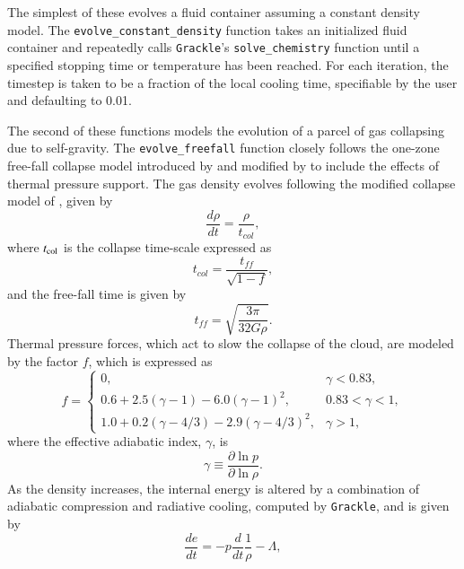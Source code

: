 The simplest of these evolves a fluid container assuming a constant
density model.  The \texttt{evolve\_constant\_density} function takes
an initialized fluid container and repeatedly calls \texttt{Grackle}'s
\texttt{solve\_chemistry} function until a specified stopping time or
temperature has been reached.  For each iteration, the timestep is
taken to be a fraction of the local cooling time, specifiable by the
user and defaulting to 0.01.

The second of these functions models the evolution of a parcel of gas
collapsing due to self-gravity.  The \texttt{evolve\_freefall} function
closely follows the one-zone free-fall collapse model introduced by
\citet{2000ApJ...534..809O} and modified by
\citet{2005ApJ...626..627O} to include the effects of thermal pressure
support.  The gas density evolves following the modified collapse
model of \citet{2005ApJ...626..627O}, given by
\begin{equation}
\frac{d \rho}{dt} = \frac{\rho}{t_{col}},
\end{equation}
where $t_{\rm col}$ is the collapse time-scale expressed as
\begin{equation}
t_{col} = \frac{t_{ff}}{\sqrt{1-f}},
\end{equation}
and the free-fall time is given by
\begin{equation}
t_{ff} = \sqrt{\frac{3 \pi}{32 G \rho}}.
\end{equation}
Thermal pressure forces, which act to slow the collapse of the cloud,
are modeled by the factor $f$, which is expressed as
\begin{equation}
f = \left\{
\begin{array}{lr}
0, & \gamma < 0.83,\\
0.6 + 2.5(\gamma - 1) - 6.0(\gamma - 1)^2, & 0.83 < \gamma < 1,\\
1.0 + 0.2(\gamma - 4/3) - 2.9(\gamma - 4/3)^2, & \gamma > 1,
\end{array}
 \right.
\end{equation}
where the effective adiabatic index, $\gamma$, is
\begin{equation}
\gamma \equiv \frac{\partial \ln p}{\partial \ln \rho}.
\end{equation}
As the density increases, the internal energy is altered by a
combination of adiabatic compression and radiative cooling, computed
by \texttt{Grackle}, and is given by
\begin{equation}
\frac{de}{dt}= -p \frac{d}{dt} \frac{1}{\rho} - {\Lambda},
\label{eq:energy}
\end{equation}
